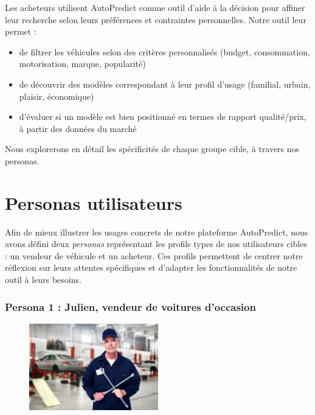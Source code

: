 \documentclass[12pt]{report}
\begin{document}
Les acheteurs utilisent AutoPredict comme outil d’aide à la décision pour affiner leur recherche selon leurs préférences et contraintes personnelles. Notre outil leur permet :
\begin{itemize}
    \item de filtrer les véhicules selon des critères personnalisés (budget, consommation, motorisation, marque, popularité) 
    \item de découvrir des modèles correspondant à leur profil d’usage (familial, urbain, plaisir, économique) 
    \item d’évaluer si un modèle est bien positionné en termes de rapport qualité/prix, à partir des données du marché
\end{itemize}
Nous explorerons en détail les spécificités de chaque groupe cible, à travers nos personas.

\section{Personas utilisateurs}

Afin de mieux illustrer les usages concrets de notre plateforme AutoPredict, nous avons défini deux \textit{personas} représentant les profils types de nos utilisateurs cibles : un vendeur de véhicule et un acheteur. Ces profils permettent de centrer notre réflexion sur leurs attentes spécifiques et d’adapter les fonctionnalités de notre outil à leurs besoins.

\subsubsection{Persona 1 : Julien, vendeur de voitures d’occasion}
\begin{figure}[H]
\centering
\includegraphics[width=0.5\textwidth]{Julien.jpg}
\end{figure}
\end{document}

